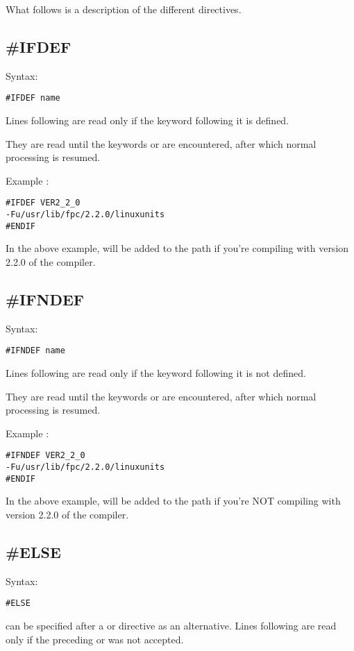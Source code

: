 What follows is a description of the different directives.

\subsection{\#IFDEF}
Syntax:
\begin{verbatim}
#IFDEF name
\end{verbatim}
Lines following  are read only if the keyword 
following it is defined.

They are read until the keywords  or  are
encountered, after which normal processing is resumed.

Example :
\begin{verbatim}
#IFDEF VER2_2_0
-Fu/usr/lib/fpc/2.2.0/linuxunits
#ENDIF
\end{verbatim}
In the above example,  will be added to
the path if you're compiling with version 2.2.0 of the compiler.

\subsection{\#IFNDEF}
Syntax:
\begin{verbatim}
#IFNDEF name
\end{verbatim}
Lines following  are read only if the keyword 
following it is not defined.

They are read until the keywords  or  are
encountered, after which normal processing is resumed.

Example :
\begin{verbatim}
#IFNDEF VER2_2_0
-Fu/usr/lib/fpc/2.2.0/linuxunits
#ENDIF
\end{verbatim}
In the above example,  will be added to
the path if you're NOT compiling with version 2.2.0 of the compiler.

\subsection{\#ELSE}
Syntax:
\begin{verbatim}
#ELSE
\end{verbatim}
 can be specified after a  or 
directive as an alternative.
Lines following  are read only if the preceding 
or  was not accepted.

